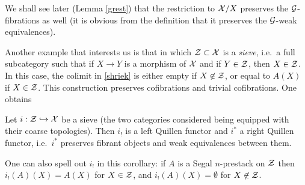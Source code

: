 We shall see later (Lemma \ref{grest}) that the restriction to ${\cal X} /X$
preserves
the ${\cal G}$-fibrations as well (it is obvious from the definition that it
preserves the ${\cal G}$-weak equivalences).

Another example that interests us is that in which ${\cal Z} \subset {\cal X}$ is a {\em
sieve}, i.e.\ a full subcategory such that if $X\rightarrow Y$ is a morphism
of ${\cal X}$ and if $Y\in {\cal Z}$, then $X\in {\cal Z}$. In this case, the colimit in
\ref{shriek} is either empty if $X\not \in {\cal Z}$, or equal to $A(X)$ if $X\in
{\cal Z}$. This construction preserves cofibrations and trivial cofibrations. One
obtains

\begin{corollary}
\label{crible}
Let $i:{\cal Z} \hookrightarrow {\cal X}$ be a sieve (the two categories considered
being equipped with their coarse topologies). Then $i_{!}$ is a left Quillen
functor and $i^{\ast}$ a right Quillen functor, i.e.\ $i^{\ast}$ preserves
fibrant objects and weak equivalences between them.
\end{corollary}
\eop

One can also spell out $i_{!}$ in this corollary: if $A$ is a Segal
$n$-prestack on ${\cal Z}$ then $i_!(A)(X) = A(X)$ for $X\in {\cal Z}$, and
$i_!(A)(X) = \emptyset$ for $X\not \in {\cal Z}$.
